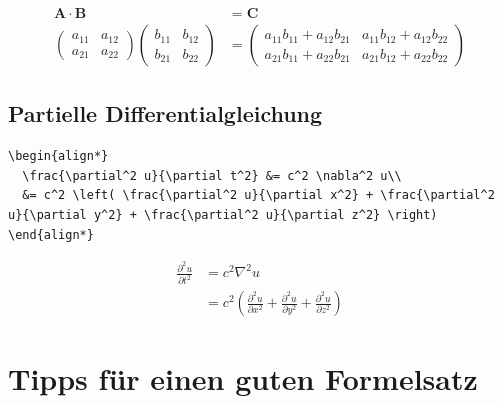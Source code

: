 \documentclass[12pt,a4paper]{article}
\begin{document}
\begin{ausgabe}
\begin{align*}
  \mathbf{A} \cdot \mathbf{B} &= \mathbf{C}\\
  \begin{pmatrix}
    a_{11} & a_{12}\\
    a_{21} & a_{22}
  \end{pmatrix}
  \begin{pmatrix}
    b_{11} & b_{12}\\
    b_{21} & b_{22}
  \end{pmatrix} &=
  \begin{pmatrix}
    a_{11}b_{11} + a_{12}b_{21} & a_{11}b_{12} + a_{12}b_{22}\\
    a_{21}b_{11} + a_{22}b_{21} & a_{21}b_{12} + a_{22}b_{22}
  \end{pmatrix}
\end{align*}
\end{ausgabe}



\subsection{Partielle Differentialgleichung}

\begin{lstlisting}[style=latex]
\begin{align*}
  \frac{\partial^2 u}{\partial t^2} &= c^2 \nabla^2 u\\
  &= c^2 \left( \frac{\partial^2 u}{\partial x^2} + \frac{\partial^2 u}{\partial y^2} + \frac{\partial^2 u}{\partial z^2} \right)
\end{align*}
\end{lstlisting}

\begin{ausgabe}
\begin{align*}
  \frac{\partial^2 u}{\partial t^2} &= c^2 \nabla^2 u\\
  &= c^2 \left( \frac{\partial^2 u}{\partial x^2} + \frac{\partial^2 u}{\partial y^2} + \frac{\partial^2 u}{\partial z^2} \right)
\end{align*}
\end{ausgabe}



\section{Tipps für einen guten Formelsatz}
\end{document}
